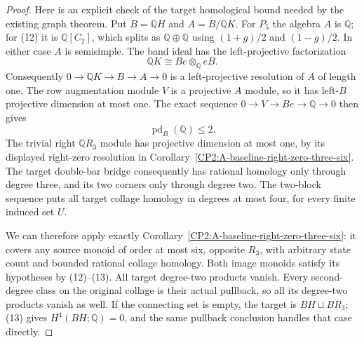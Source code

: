 \begin{proof}
Here is an explicit check of the target homological bound needed by
the existing graph theorem.  Put $B=\mathbb QH$ and
$A=B/\mathbb QK$.  For $P_5$ the algebra $A$ is $\mathbb Q$;
for (12) it is $\mathbb Q[C_2]$, which splits as
$\mathbb Q\oplus\mathbb Q$ using $(1+g)/2$ and $(1-g)/2$.
In either case $A$ is semisimple.
The band ideal has the left-projective factorization
\[
 \mathbb QK\cong Be\otimes_{\mathbb Q}eB.
\]
Consequently $0\to\mathbb QK\to B\to A\to0$ is a left-projective
resolution of $A$ of length one.  The row augmentation module $V$
is a projective $A$ module, so it has left-$B$ projective dimension
at most one.  The exact sequence
$0\to V\to Be\to\mathbb Q\to0$ then gives
\[
 \operatorname{pd}_B(\mathbb Q)\leq2.                           \tag{13}
\]
The trivial right $\mathbb Q R_3$ module has projective dimension
at most one, by its displayed right-zero resolution in
Corollary~\ref{CP2:A-baseline-right-zero-three-six}.
The target double-bar bridge consequently has rational homology
only through degree three, and its two corners only through degree
two.  The two-block sequence puts all target collage homology in
degrees at most four, for every finite induced set $U$.

We can therefore apply exactly
Corollary~\ref{CP2:A-baseline-right-zero-three-six}: it covers any
source monoid of order at most six, opposite $R_3$, with arbitrary
state count and bounded rational collage homology.  Both image monoids
satisfy its hypotheses by (12)--(13).  All target degree-two products
vanish.  Every second-degree class on the original collage is their
actual pullback, so all its degree-two products vanish as well.
If the connecting set is empty, the target is $BH\sqcup BR_3$;
(13) gives $H^4(BH;\mathbb Q)=0$, and the same pullback conclusion
handles that case directly.
\end{proof}

